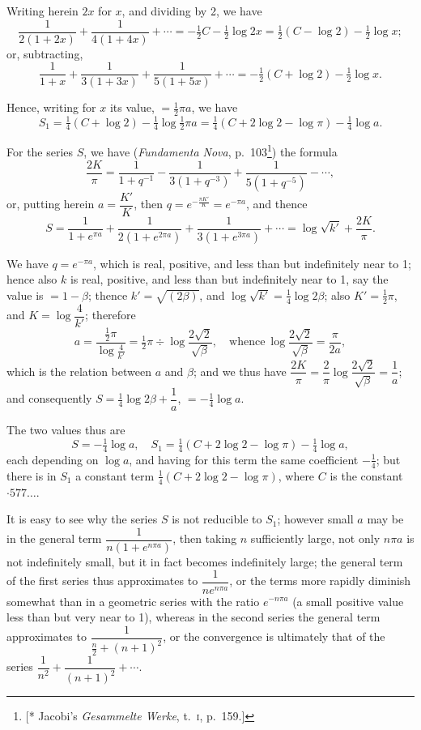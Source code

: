 \documentclass[11pt,a4paper]{article}
\begin{document}
\medskip

Writing herein $2x$ for $x$, and dividing by 2, we have
\[
\frac{1}{2(1 + 2x)} + \frac{1}{4(1 + 4x)} + \cdots = -\tfrac{1}{2} C - \tfrac{1}{2} \log 2x = \tfrac{1}{2}(C - \log 2) - \tfrac{1}{2} \log x;
\]
or, subtracting,
\[
\frac{1}{1 + x} + \frac{1}{3(1 + 3x)} + \frac{1}{5(1 + 5x)} + \cdots = -\tfrac{1}{2}(C + \log 2) - \tfrac{1}{2}\log x.
\]

Hence, writing for $x$ its value, $= \tfrac{1}{2}\pi a$, we have
\[
S_1 = \tfrac{1}{4}(C + \log 2) - \tfrac{1}{4} \log \tfrac{1}{2}\pi a = \tfrac{1}{4}(C + 2\log 2 - \log\pi) - \tfrac{1}{4}\log a.
\]

For the series $S$, we have (\emph{Fundamenta Nova}, p.\ 103\footnote{[* Jacobi's \emph{Gesammelte Werke}, t.\ \textsc{i}, p.\ 159.]}) the formula
\[
\frac{2K}{\pi} = \frac{1}{1 + q^{-1}} - \frac{1}{3(1 + q^{-3})} + \frac{1}{5(1 + q^{-5})} - \cdots,
\]
or, putting herein $a = \dfrac{K'}{K}$, then $q = e^{-\frac{\pi K'}{K}} = e^{-\pi a}$, and thence
\[
S = \frac{1}{1 + e^{\pi a}} + \frac{1}{2(1 + e^{2\pi a})} + \frac{1}{3(1 + e^{3\pi a})} + \cdots = \log \sqrt{k'} + \frac{2K}{\pi}.
\]

We have $q = e^{-\pi a}$, which is real, positive, and less than but indefinitely near to 1; hence also $k$ is real, positive, and less than but indefinitely near to 1, say the value is $= 1 - \beta$; thence $k' = \sqrt{(2\beta)}$, and $\log \sqrt{k'} = \tfrac{1}{4}\log 2\beta$; also $K' = \tfrac{1}{2}\pi$, and $K = \log\dfrac{4}{k'}$; therefore
\[
a = \frac{\tfrac{1}{2}\pi}{\log\frac{4}{k'}} = \tfrac{1}{2}\pi \div \log\frac{2\sqrt{2}}{\sqrt{\beta}},\quad \text{whence}\ \log \frac{2\sqrt{2}}{\sqrt{\beta}} = \frac{\pi}{2a},
\]
which is the relation between $a$ and $\beta$; and we thus have $\dfrac{2K}{\pi} = \dfrac{2}{\pi}\log\dfrac{2\sqrt{2}}{\sqrt{\beta}} = \dfrac{1}{a}$; and consequently $S = \tfrac{1}{4}\log 2\beta + \dfrac{1}{a}$, $= -\tfrac{1}{4} \log a$.

The two values thus are
\[
S = -\tfrac{1}{4} \log a,\quad S_1 = \tfrac{1}{4}(C + 2\log 2 - \log \pi) - \tfrac{1}{4} \log a,
\]
each depending on $\log a$, and having for this term the same coefficient $-\tfrac{1}{4}$; but there is in $S_1$ a constant term $\tfrac{1}{4}(C + 2\log 2 - \log \pi)$, where $C$ is the constant $\cdot 577\ldots$.

It is easy to see why the series $S$ is not reducible to $S_1$; however small $a$ may be in the general term $\dfrac{1}{n(1 + e^{n\pi a})}$, then taking $n$ sufficiently large, not only $n\pi a$ is not indefinitely small, but it in fact becomes indefinitely large; the general term of the first series thus approximates to $\dfrac{1}{n e^{n\pi a}}$, or the terms more rapidly diminish somewhat than in a geometric series with the ratio $e^{-n\pi a}$ (a small positive value less than but very near to 1), whereas in the second series the general term approximates to $\dfrac{1}{\frac{n}{2} + (n + 1)^2}$, or the convergence is ultimately that of the series $\dfrac{1}{n^2} + \dfrac{1}{(n + 1)^2} + \cdots$.
\end{document}
